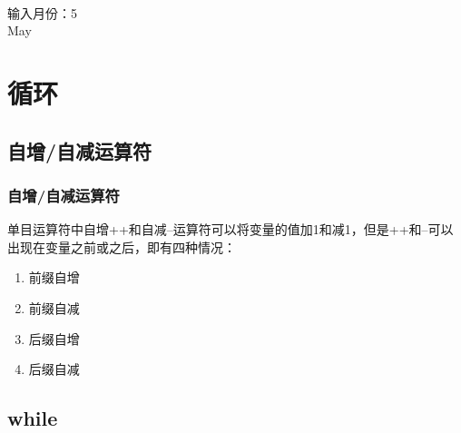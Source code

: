 \begin{tcolorbox}
	 \\
	输入月份：5 \\
	May
\end{tcolorbox}

\newpage

\chapter{循环}

\section{自增/自减运算符}

\subsection{自增/自减运算符}

单目运算符中自增++和自减--运算符可以将变量的值加1和减1，但是++和--可以出现在变量之前或之后，即有四种情况：

\begin{enumerate}
	\item 前缀自增
	\item 前缀自减
	\item 后缀自增
	\item 后缀自减
\end{enumerate}

\begin{table}[H]
	\centering
	\caption{自增/自减运算符}
\end{table}

\newpage

\section{while}

